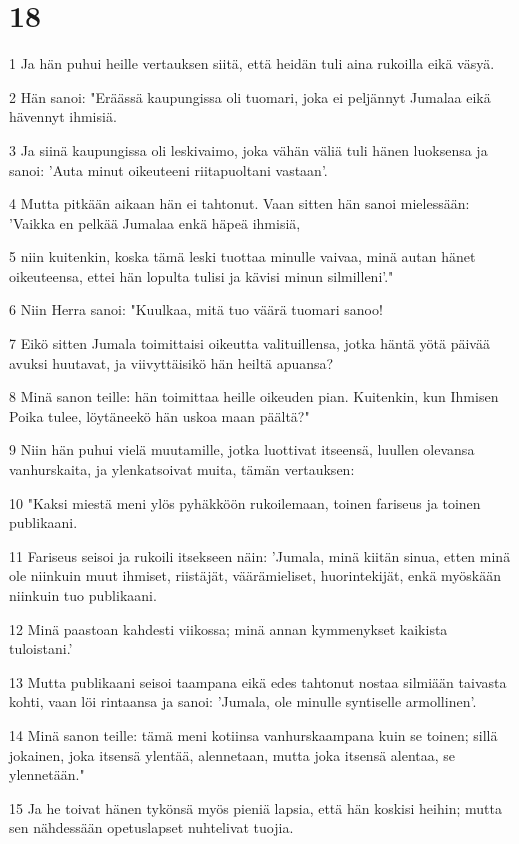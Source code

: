 \chapter{18}

\par 1 Ja hän puhui heille vertauksen siitä, että heidän tuli aina rukoilla eikä väsyä.
\par 2 Hän sanoi: "Eräässä kaupungissa oli tuomari, joka ei peljännyt Jumalaa eikä hävennyt ihmisiä.
\par 3 Ja siinä kaupungissa oli leskivaimo, joka vähän väliä tuli hänen luoksensa ja sanoi: 'Auta minut oikeuteeni riitapuoltani vastaan'.
\par 4 Mutta pitkään aikaan hän ei tahtonut. Vaan sitten hän sanoi mielessään: 'Vaikka en pelkää Jumalaa enkä häpeä ihmisiä,
\par 5 niin kuitenkin, koska tämä leski tuottaa minulle vaivaa, minä autan hänet oikeuteensa, ettei hän lopulta tulisi ja kävisi minun silmilleni'."
\par 6 Niin Herra sanoi: "Kuulkaa, mitä tuo väärä tuomari sanoo!
\par 7 Eikö sitten Jumala toimittaisi oikeutta valituillensa, jotka häntä yötä päivää avuksi huutavat, ja viivyttäisikö hän heiltä apuansa?
\par 8 Minä sanon teille: hän toimittaa heille oikeuden pian. Kuitenkin, kun Ihmisen Poika tulee, löytäneekö hän uskoa maan päältä?"
\par 9 Niin hän puhui vielä muutamille, jotka luottivat itseensä, luullen olevansa vanhurskaita, ja ylenkatsoivat muita, tämän vertauksen:
\par 10 "Kaksi miestä meni ylös pyhäkköön rukoilemaan, toinen fariseus ja toinen publikaani.
\par 11 Fariseus seisoi ja rukoili itsekseen näin: 'Jumala, minä kiitän sinua, etten minä ole niinkuin muut ihmiset, riistäjät, väärämieliset, huorintekijät, enkä myöskään niinkuin tuo publikaani.
\par 12 Minä paastoan kahdesti viikossa; minä annan kymmenykset kaikista tuloistani.'
\par 13 Mutta publikaani seisoi taampana eikä edes tahtonut nostaa silmiään taivasta kohti, vaan löi rintaansa ja sanoi: 'Jumala, ole minulle syntiselle armollinen'.
\par 14 Minä sanon teille: tämä meni kotiinsa vanhurskaampana kuin se toinen; sillä jokainen, joka itsensä ylentää, alennetaan, mutta joka itsensä alentaa, se ylennetään."
\par 15 Ja he toivat hänen tykönsä myös pieniä lapsia, että hän koskisi heihin; mutta sen nähdessään opetuslapset nuhtelivat tuojia.
